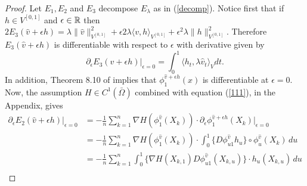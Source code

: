 \documentclass[noinfoline]{imsart}
\begin{document}
\begin{proof}
Let $E_1, E_2$ and $E_3$ decompose $E_\lambda$ as in (\ref{decomp}). Notice first that if  $h\in V^{[0,1]}$  and $\epsilon \in \Bbb R$ then $2 E_3(\hat v+\epsilon h) = {\lambda}\| \hat v \|^2_{V^{[0,1]}} + \epsilon 2 \lambda\langle v,h \rangle_{V^{[0,1]}}  +\epsilon^2{\lambda}\| h \|^2_{V^{[0,1]}} $. Therefore $E_3(\hat v+\epsilon h)$ is differentiable with respect to $\epsilon$ with derivative given by
\begin{equation}
 \label{dderE1}
{\partial_\epsilon}  E_3(\hat v+\epsilon h)\bigr|_{\epsilon=0}
=  \int_0^1 \langle h_t,\lambda \hat v_t \rangle_V dt.
\end{equation}
In addition, Theorem 8.10 of \cite{you:10}
 implies that  $\phi^{\hat v+\epsilon h}_1(x)$  is differentiable at $\epsilon = 0$. %
Now, the assumption  $H\in C^1(\bar\Omega)$ combined with equation (\ref{111}), in the Appendix, gives %
\begin{align}
\partial_\epsilon E_2(\hat v+\epsilon h)\bigr|_{\epsilon=0} \nonumber
&= -\frac{1}{n}\sum_{k=1}^n  \nabla H(\phi_1^{\hat v }(X_k)) \cdot {\partial_\epsilon}  \phi^{\hat v+\epsilon h}_{1}(X_k)\bigr|_{\epsilon = 0} \nonumber \\
&= -\frac{1}{n}\sum_{k=1}^n  \nabla H(\phi_1^{\hat v }(X_k)) \cdot \int_0^1  \bigl\{D\phi^{ \hat v}_{u1} h_u \bigr\}\circ{\phi^{ \hat v}_{u}(X_k)}\,   du \nonumber \\
&= -\frac{1}{n}\sum_{k=1}^n \int_0^1  \bigl\{  \nabla H( X_{k,1}) D\phi^{\hat v}_{u1}(X_{k,u}) \bigr\} \cdot  h_u (X_{k,u})\,   du \nonumber \\

\end{align}
\end{proof}
\end{document}
